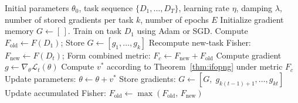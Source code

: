 \begin{algorithm}[htbp]
\caption{iFOPNG Algorithm (extends \texttt{FOPNG}~\citep{garg_fisher-orthogonal_2026}
       via combined metric $F_c$)}
\label{alg:ifopng}
\small
\setlength{\abovedisplayskip}{2pt}
\setlength{\belowdisplayskip}{2pt}
\begin{algorithmic}[1]
\Require Initial parameters $\theta_0$, task sequence $\{D_1,\ldots,D_T\}$,
              learning rate $\eta$, damping $\lambda$,
              number of stored gradients per task $k$, number of epochs $E$
\State Initialize gradient memory $G \leftarrow [\,]$.
       Train on task $D_1$ using Adam or SGD.
\State Compute $F_{\mathrm{old}} \leftarrow F(D_1)$;\quad
       Store $G \leftarrow [g_1, \ldots, g_k]$
              \State Recompute new-task Fisher:
                     ${F}_{\mathrm{new}} \leftarrow F(D_t)$;
              \State Form combined metric:
                     $F_c \leftarrow F_{\mathrm{new}} + F_{\mathrm{old}}$
              \State Compute gradient $g \leftarrow \nabla_\theta \mathcal{L}_t(\theta)$
              \State Compute $v^*$ according to Theorem~\ref{thm:ifopng}
                     under metric $F_c$
              \State Update parameters: $\theta \leftarrow \theta + v^*$
              \EndFor
       \EndFor
       \State Store gradients:
              $G \leftarrow [G,\; g_{k(t-1)+1}, \ldots, g_{kt}]$
       \State Update accumulated Fisher:
              $F_{\mathrm{old}} \leftarrow
              \max\!\left(F_{\mathrm{old}},\, F_{\mathrm{new}}\right)$
\EndFor
\end{algorithmic}
\end{algorithm}


